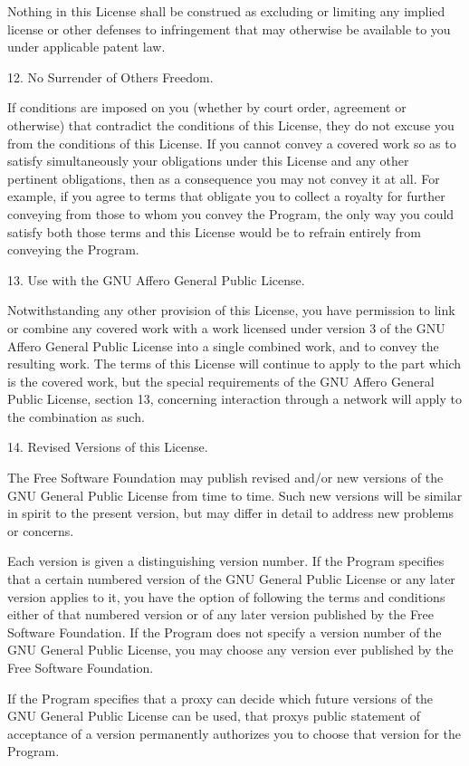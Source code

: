 \documentclass[letterpaper,10pt,english]{sphinxmanual}
\begin{document}
\begin{sphinxVerbatim}[commandchars=\\\{\}]
  Nothing in this License shall be construed as excluding or limiting
any implied license or other defenses to infringement that may
otherwise be available to you under applicable patent law.

  12. No Surrender of Others\PYGZsq{} Freedom.

  If conditions are imposed on you (whether by court order, agreement or
otherwise) that contradict the conditions of this License, they do not
excuse you from the conditions of this License.  If you cannot convey a
covered work so as to satisfy simultaneously your obligations under this
License and any other pertinent obligations, then as a consequence you may
not convey it at all.  For example, if you agree to terms that obligate you
to collect a royalty for further conveying from those to whom you convey
the Program, the only way you could satisfy both those terms and this
License would be to refrain entirely from conveying the Program.

  13. Use with the GNU Affero General Public License.

  Notwithstanding any other provision of this License, you have
permission to link or combine any covered work with a work licensed
under version 3 of the GNU Affero General Public License into a single
combined work, and to convey the resulting work.  The terms of this
License will continue to apply to the part which is the covered work,
but the special requirements of the GNU Affero General Public License,
section 13, concerning interaction through a network will apply to the
combination as such.

  14. Revised Versions of this License.

  The Free Software Foundation may publish revised and/or new versions of
the GNU General Public License from time to time.  Such new versions will
be similar in spirit to the present version, but may differ in detail to
address new problems or concerns.

  Each version is given a distinguishing version number.  If the
Program specifies that a certain numbered version of the GNU General
Public License \PYGZdq{}or any later version\PYGZdq{} applies to it, you have the
option of following the terms and conditions either of that numbered
version or of any later version published by the Free Software
Foundation.  If the Program does not specify a version number of the
GNU General Public License, you may choose any version ever published
by the Free Software Foundation.

  If the Program specifies that a proxy can decide which future
versions of the GNU General Public License can be used, that proxy\PYGZsq{}s
public statement of acceptance of a version permanently authorizes you
to choose that version for the Program.


\end{sphinxVerbatim}
\end{document}
